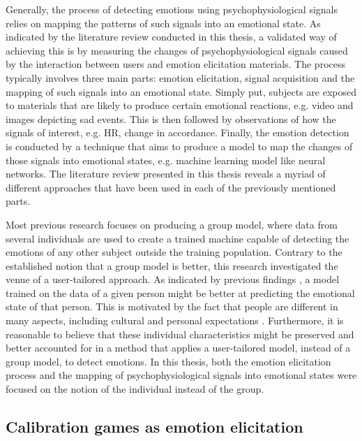 Generally, the process of detecting emotions using psychophysiological signals relies on mapping the patterns of such signals into an emotional state. As indicated by the literature review conducted in this thesis, a validated way of achieving this is by measuring the changes of psychophysiological signals caused by the interaction between users and emotion elicitation materials. The process typically involves three main parts: emotion elicitation, signal acquisition and the mapping of such signals into an emotional state. Simply put, subjects are exposed to materials that are likely to produce certain emotional reactions, e.g. video and images depicting sad events. This is then followed by observations of how the signals of interest, e.g. HR, change in accordance. Finally, the emotion detection is conducted by a technique that aims to produce a model to map the changes of those signals into emotional states, e.g. machine learning model like neural networks. The literature review presented in this thesis reveals a myriad of different approaches that have been used in each of the previously mentioned parts.

Most previous research focuses on producing a group model, where data from several individuals are used to create a trained machine capable of detecting the emotions of any other subject outside the training population. Contrary to the established notion that a group model is better, this research investigated the venue of a user-tailored approach. As indicated by previous findings \parencite{bailenson2008real}, a model trained on the data of a given person might be better at predicting the emotional state of that person. This is motivated by the fact that people are different in many aspects, including cultural and personal expectations \parencite{goldberg1993structure}. Furthermore, it is reasonable to believe that these individual characteristics might be preserved and better accounted for in a method that applies a user-tailored model, instead of a group model, to detect emotions. In this thesis, both the emotion elicitation process and the mapping of psychophysiological signals into emotional states were focused on the notion of the individual instead of the group.

\subsection{Calibration games as emotion elicitation}


